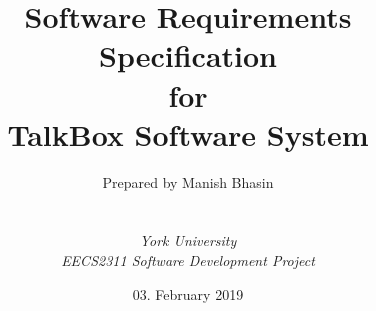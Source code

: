 
\def\Company{Group 15}
\def\Institute{\textit{York University}}
\def\Course{\textit{EECS2311 Software Development Project}}

\def\BoldTitle{Software Requirements Specification}

\def\Subtitle{for \\ TalkBox Software System \\}
\def\Authors{Prepared by Manish Bhasin} 
\def\Shortname{A.Sandu}


\title{\textbf{\BoldTitle}\\\Subtitle}
\author{\Authors \\ \\ \\ \Institute\\ \Course\\ }
\date{03. February 2019}

